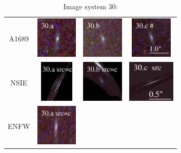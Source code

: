 \documentclass[useAMS,usenatbib]{mn2e}
\begin{document}
\begin{table}
  \caption{Image system 30:}\vspace{0mm}
  \begin{tabular}{cccc}
    \multicolumn{1}{m{1cm}}{{\Large A1689}}
    & \multicolumn{1}{m{1.7cm}}{\includegraphics[height=2.00cm,clip]{figs/nsie_img/rgb.img_30_a.ps}}
    & \multicolumn{1}{m{1.7cm}}{\includegraphics[height=2.00cm,clip]{figs/nsie_img/rgb.img_30_b.ps}}
    & \multicolumn{1}{m{1.7cm}}{\includegraphics[height=2.00cm,clip]{figs/nsie_img/rgb.img_30_c.ps}} \\
    \multicolumn{1}{m{1cm}}{{\Large NSIE}}
    & \multicolumn{1}{m{1.7cm}}{\includegraphics[height=2.00cm,clip]{figs/nsie_img/rgb.pre_30_a_c_tri.ps}}
    & \multicolumn{1}{m{1.7cm}}{\includegraphics[height=2.00cm,clip]{figs/nsie_img/rgb.pre_30_b_c_tri.ps}}
    & \multicolumn{1}{m{1.7cm}}{\includegraphics[height=2.00cm,clip]{figs/nsie_img/rgb.src_30_c.ps}} \\
    \multicolumn{1}{m{1cm}}{{\Large ENFW}}
    & \multicolumn{1}{m{1.7cm}}{\includegraphics[height=2.00cm,clip]{figs/enfw_img/rgb.pre_30_a_c_tri.ps}}

\end{tabular}
\end{table}
\end{document}
